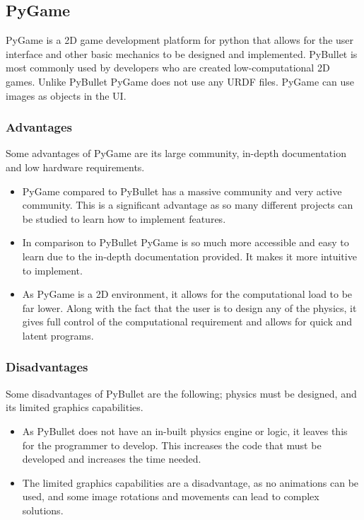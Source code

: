 \documentclass[a4paper,11pt]{article}
\begin{document}
\subsection{PyGame}

PyGame is a 2D game development platform for python that allows for the user interface and other basic mechanics to be designed and implemented. PyBullet is most commonly used by developers who are created low-computational 2D games. Unlike PyBullet PyGame does not use any URDF files. PyGame can use images as objects in the UI. 

\subsubsection{Advantages}
Some advantages of PyGame are its large community, in-depth documentation and low hardware requirements. 

\begin{itemize}
  \item PyGame compared to PyBullet has a massive community and very active community. This is a significant advantage as so many different projects can be studied to learn how to implement features. 
  \item In comparison to PyBullet PyGame is so much more accessible and easy to learn due to the in-depth documentation provided. It makes it more intuitive to implement. 

  \item As PyGame is a 2D environment, it allows for the computational load to be far lower. Along with the fact that the user is to design any of the physics, it gives full control of the computational requirement and allows for quick and latent programs.


\end{itemize}


\subsubsection{Disadvantages}

Some disadvantages of PyBullet are the following; physics must be designed, and its limited graphics capabilities. 
\begin{itemize}
  \item As PyBullet does not have an in-built physics engine or logic, it leaves this for the programmer to develop. This increases the code that must be developed and increases the time needed. 
  \item The limited graphics capabilities are a disadvantage, as no animations can be used, and some image rotations and movements can lead to complex solutions.

\end{itemize}
\end{document}
